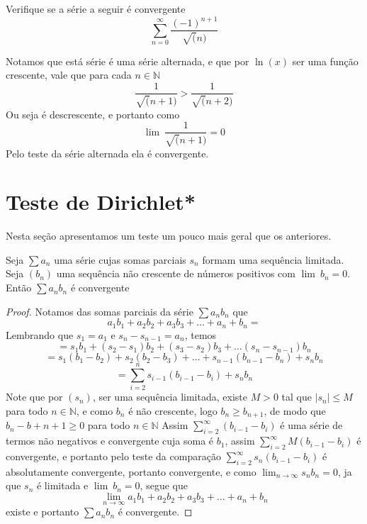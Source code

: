\begin{exer}
    Verifique se a série a seguir é convergente
    $$\sum_{n = 0}^{\infty} \frac{(-1)^{n+1}}{\sqrt(n)} $$
\end{exer}

\begin{resp}
    Notamos que está série é uma série alternada, e que por $\ln(x)$ ser uma
    função crescente, vale que para cada $n \in \mathbb{N}$
    $$\frac{1}{\sqrt(n+1)} > \frac{1}{\sqrt(n+2)}$$
    Ou seja é descrescente, e portanto como
    $$\lim{\:} \frac{1}{\sqrt(n+1)} = 0 $$
    Pelo teste da série alternada ela é convergente.
\end{resp}


\section{Teste de Dirichlet*}
\construirSec

Nesta seção apresentamos um teste um pouco mais geral que os anteriores.

\begin{teo}
    Seja $\sum a_n$ uma série cujas somas parciais $s_n$ formam uma
    sequência limitada. Seja $(b_n)$ uma sequência não crescente de números
    positivos com $\lim{\:} b_n = 0$. Então $\sum a_n b_n$ é convergente
\end{teo}

\begin{proof}
    Notamos das somas parciais da série $\sum a_n b_n$ que
    $$ a_1b_1 +a_2b_2 + a_3b_3 + \dots + a_n +b_n=$$
    Lembrando que $s_1 = a_1$ e $s_n -s_{n-1}= a_n$, temos
    $$ = s_1b_1 + (s_2 - s_1)b_2 + (s_3 - s_2)b_3 + \dots (s_n-s_{n-1})b_n$$
    $$ =s_1(b_1 - b_2) + s_2(b_2 - b_3) + \dots +s_{n-1}(b_{n-1}-b_n) + s_nb_n$$
    $$ = \sum_{i=2}^n s_{i-1}(b_{i-1}-b_i) + s_nb_n$$
    Note que por $(s_n)$, ser uma sequência limitada, existe $M>0$ tal que
    $|s_n| \leq M$ para todo $n \in \mathbb{N}$, e como $b_n$ é não crescente, logo
    $b_n \geq b_{n+1}$, de modo que $ b_n -b+{n+1} \geq 0$ para todo $n \in \mathbb{N}$
    Assim $\sum_{i=2}^{\infty} (b_{i-1}-b_i)$ é uma série de termos não negativos
    e convergente cuja soma é $b_1$, assim $\sum_{i=2}^{\infty} M(b_{i-1}-b_i)$
    é convergente, e portanto pelo teste da comparação $\sum_{i=2}^{\infty} 
    s_n(b_{i-1}-b_i)$ é absolutamente convergente, portanto convergente, e como
    $\lim_{n \to \infty} s_n b_n = 0$, ja que $s_n$ é limitada e $\lim{\:}b_n = 0$,
    segue que
    $$ \lim_{n \to \infty} a_1b_1 +a_2b_2 + a_3b_3 + \dots + a_n +b_n$$
    existe e portanto $\sum a_n b_n$ é convergente.
\end{proof}
